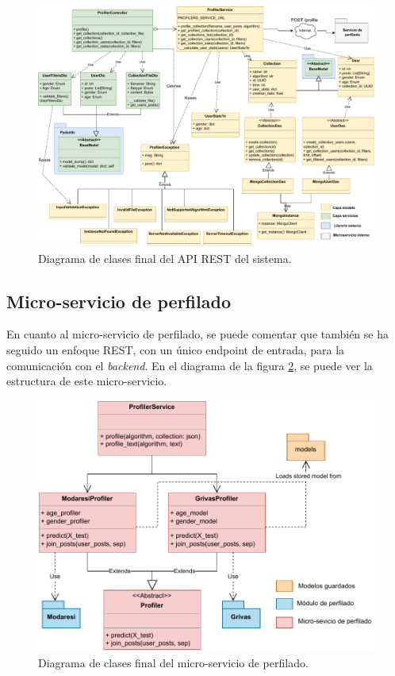 \begin{figure}[H]
  \centering
  \includegraphics[width=\textwidth]{imaxes/diagramas/backend-classes.pdf}
  \caption{Diagrama de clases final del API REST del sistema.}  \label{fig:diagrama/api}
\end{figure}

\subsection{Micro-servicio de perfilado}
En cuanto al micro-servicio de perfilado, se puede comentar que también se ha seguido un enfoque REST, con un único endpoint de entrada, para la comunicación con el \textit{backend}. En el diagrama de la figura \ref{fig:diagrama/micro-servicio}, se puede ver la estructura de este micro-servicio.

\begin{figure}[H]
  \centering
  \includegraphics[width=\textwidth]{imaxes/diagramas/profiler-service.pdf}
  \caption{Diagrama de clases final del micro-servicio de perfilado.}  \label{fig:diagrama/micro-servicio}
\end{figure}

